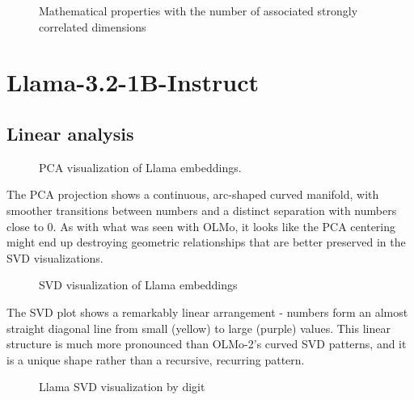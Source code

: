 \documentclass[
  a4paper, twoside, 10pt, titlepage]{book}
\makeatletter
\newcommand*\pandocbounded[1]{%
  \sbox\pandoc@box{#1}%
  \Gscale@div\@tempa{\textheight}{\dimexpr\ht\pandoc@box+\dp\pandoc@box\relax}%
  \Gscale@div\@tempb{\linewidth}{\wd\pandoc@box}%
  \ifdim\@tempb\p@<\@tempa\p@\let\@tempa\@tempb\fi%
  \ifdim\@tempa\p@<\p@\scalebox{\@tempa}{\usebox\pandoc@box}%
  \else\usebox{\pandoc@box}%
  \fi%
}
\makeatother
\begin{document}
\begin{figure}
\centering
\pandocbounded{}
\caption{Mathematical properties with the number of associated strongly
correlated dimensions}\label{fig-olmo-properties}
\end{figure}

\section{Llama-3.2-1B-Instruct}\label{llama-3.2-1b-instruct}

\subsection{Linear analysis}\label{linear-analysis-1}

\begin{figure}
\centering
\pandocbounded{}
\caption{PCA visualization of Llama embeddings.}\label{fig-llama-pca}
\end{figure}

The PCA projection shows a continuous, arc-shaped curved manifold, with
smoother transitions between numbers and a distinct separation with
numbers close to 0. As with what was seen with OLMo, it looks like the
PCA centering might end up destroying geometric relationships that are
better preserved in the SVD visualizations.

\begin{figure}
\centering
\pandocbounded{}
\caption{SVD visualization of Llama embeddings}\label{fig-llama-svd}
\end{figure}

The SVD plot shows a remarkably linear arrangement - numbers form an
almost straight diagonal line from small (yellow) to large (purple)
values. This linear structure is much more pronounced than OLMo-2's
curved SVD patterns, and it is a unique shape rather than a recursive,
recurring pattern.

\begin{figure}
\centering
\pandocbounded{}
\caption{Llama SVD visualization by digit}\label{fig-llama-svd-digits}
\end{figure}
\end{document}
